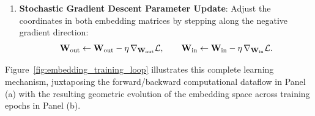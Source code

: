 \documentclass[../../main.tex]{subfiles}
\begin{document}
\begin{enumerate}
\begin{equation}
    \nabla_{\mW_{\text{out}}} \Loss = \vh \, \boldsymbol{\delta}^\top \in \R^{d \times V}, \quad \nabla_\vh \Loss = \mW_{\text{out}} \boldsymbol{\delta} \in \R^d, \quad \nabla_{\mW_{\text{in}}} \Loss = (\nabla_\vh \Loss) \, \ve_{\text{context}}^\top \in \R^{d \times V}.
    \end{equation}
    \item \textbf{Stochastic Gradient Descent Parameter Update}: Adjust the coordinates in both embedding matrices by stepping along the negative gradient direction:
    \begin{equation}
    \label{eq:sgd_updates}
    \mathbf{W}_{\text{out}} \leftarrow \mathbf{W}_{\text{out}} - \eta \, \nabla_{\mathbf{W}_{\text{out}}} \mathcal{L}, \qquad \mathbf{W}_{\text{in}} \leftarrow \mathbf{W}_{\text{in}} - \eta \, \nabla_{\mathbf{W}_{\text{in}}} \mathcal{L}.
    \end{equation}
\end{enumerate}

Figure~\ref{fig:embedding_training_loop} illustrates this complete learning mechanism, juxtaposing the forward/backward computational dataflow in Panel (a) with the resulting geometric evolution of the embedding space across training epochs in Panel (b).
\end{document}
